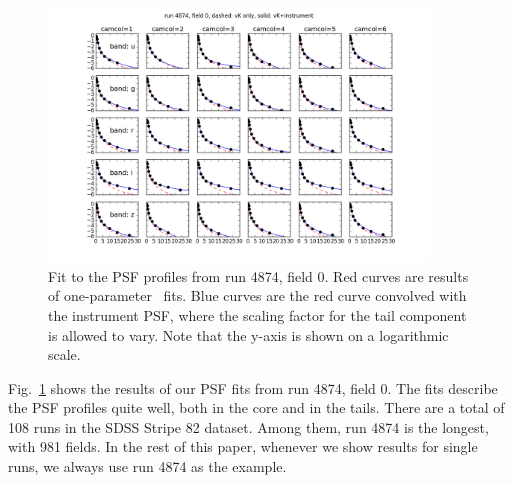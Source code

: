 \begin{figure}
\centering
\includegraphics[width=0.9\textwidth]{FIGURES/psffit.png}
\caption{Fit to the PSF profiles from run 4874, field 0. Red curves
  are results of one-parameter \vk~fits. Blue curves are the red
  curve convolved with the instrument PSF, where the scaling factor for
  the tail component is allowed to vary. Note that the y-axis is shown on
  a logarithmic scale.
\label{fig:psffit}}
\end{figure}

Fig.~\ref{fig:psffit} shows the results of our PSF fits from run 4874,
field 0. The fits describe the PSF profiles quite well, both in the core and in the tails.
There are a total of 108 runs in the SDSS Stripe 82 dataset. Among them, run 4874 
is the longest, with 981 fields. In the rest of this paper, whenever we show 
results for single runs, we always use run 4874 as the example.
